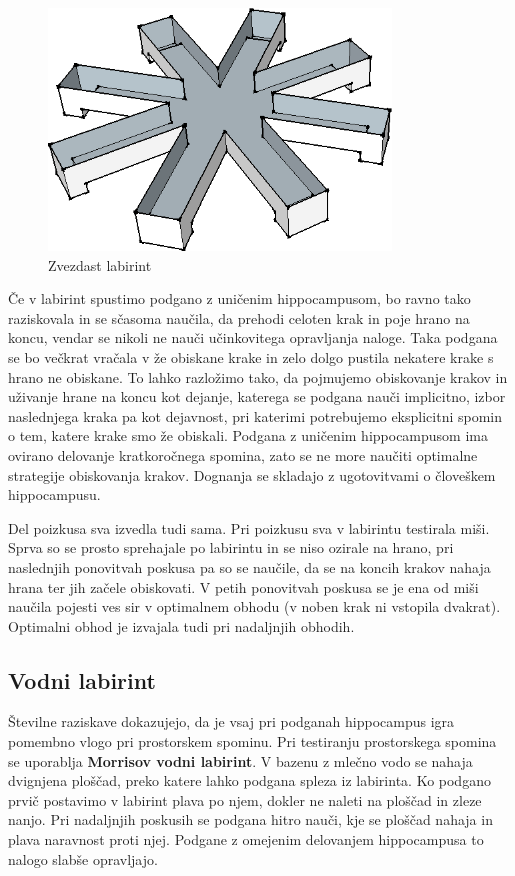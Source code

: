 \documentclass[10pt,a4paper]{article}
\begin{document}
\begin{figure}[h]
  \centering
    \includegraphics[width=.5\textwidth]{Labirint.png}
  \caption{Zvezdast labirint}
  \label{slikaLabirinta}
\end{figure}

Če v labirint spustimo podgano z uničenim hippocampusom, bo ravno tako raziskovala in se sčasoma naučila, da prehodi celoten krak in poje hrano na koncu, vendar se nikoli ne nauči učinkovitega opravljanja naloge. Taka podgana se bo večkrat vračala v že obiskane krake in zelo dolgo pustila nekatere krake s hrano ne obiskane. To lahko razložimo tako, da pojmujemo obiskovanje krakov in uživanje hrane na koncu kot dejanje, katerega se podgana nauči implicitno, izbor naslednjega kraka pa kot dejavnost, pri katerimi potrebujemo eksplicitni spomin o tem, katere krake smo že obiskali. Podgana z uničenim hippocampusom ima ovirano delovanje kratkoročnega spomina, zato se ne more naučiti optimalne strategije obiskovanja krakov. Dognanja se skladajo z ugotovitvami o človeškem hippocampusu.

Del poizkusa sva izvedla tudi sama. Pri poizkusu sva v labirintu testirala miši. Sprva so se prosto sprehajale po labirintu in se niso ozirale na hrano, pri naslednjih ponovitvah poskusa pa so se naučile, da se na koncih krakov nahaja hrana ter jih začele obiskovati. V petih ponovitvah poskusa se je ena od miši naučila pojesti ves sir v optimalnem obhodu (v noben krak ni vstopila dvakrat). Optimalni obhod je izvajala tudi pri nadaljnjih obhodih.

\subsection{Vodni labirint}
Številne raziskave dokazujejo, da je vsaj pri podganah hippocampus igra pomembno vlogo pri prostorskem spominu. Pri testiranju prostorskega spomina se uporablja \textbf{Morrisov vodni labirint}. V bazenu z mlečno vodo se nahaja dvignjena ploščad, preko katere lahko podgana spleza iz labirinta. Ko podgano prvič postavimo v labirint plava po njem, dokler ne naleti na ploščad in zleze nanjo. Pri nadaljnjih poskusih se podgana hitro nauči, kje se ploščad nahaja in plava naravnost proti njej. Podgane z omejenim delovanjem hippocampusa to nalogo slabše opravljajo.
\end{document}
